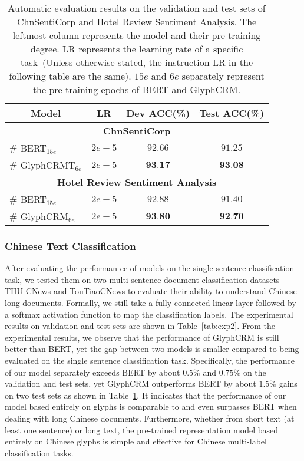 \begin{table}[t]
\renewcommand\arraystretch{1.1}
    \centering
     \caption{Automatic evaluation results on the validation and test sets of ChnSentiCorp and Hotel Review Sentiment Analysis. The leftmost column represents the model and their pre-training degree. LR represents the learning rate of a specific task~(Unless otherwise stated, the instruction LR in the following table are the same). $15e$ and $6e$ separately represent the pre-training epochs of BERT and GlyphCRM.}
    \label{tab:exp1}
    \begin{tabular}{lccc}
    \toprule[0.9pt]
    \multicolumn{1}{c}{\textbf{Model}} & \multicolumn{1}{c}{\textbf{LR}} & \multicolumn{1}{c}{\textbf{Dev ACC(\%)}} & \multicolumn{1}{c}{\textbf{Test ACC(\%)}} \\
    \midrule[0.7pt]
    \multicolumn{4}{c}{\textbf{ChnSentiCorp}}\\ \hline
    \# BERT$_{15e}$ & $2e-5$ & $92.66$ & $91.25$ \\
    \# GlyphCRMT$_{6e}$ & $2e-5$ & $\textbf{93.17}$ & $\textbf{93.08}$\\\midrule[0.7pt]
    \multicolumn{4}{c}{\textbf{Hotel Review Sentiment Analysis}}\\ \hline
    \# BERT$_{15e}$ & $2e-5$ & $92.88$ & $91.40$ \\
    \# GlyphCRM$_{6e}$ & $2e-5$ & $\textbf{93.80}$ & $\textbf{92.70}$\\
    \bottomrule[0.9pt]
    \end{tabular}
\end{table}


\subsubsection{Chinese Text Classification} After evaluating the performan-ce of models on the single sentence classification task, we tested them on two multi-sentence document classification datasets THU-CNews and TouTiaoCNews to evaluate their ability to understand Chinese long documents. Formally, we still take a fully connected linear layer followed by a softmax activation function to map the classification labels. The experimental results on validation and test sets are shown in Table~\ref{tab:exp2}. From the experimental results, we observe that the performance of GlyphCRM is still better than BERT, yet the gap between two models is smaller compared to being evaluated on the single sentence classification task. Specifically, the performance of our model separately exceeds BERT by about $0.5\%$ and $0.75\%$ on the validation and test sets, yet GlyphCRM outperforms BERT by about $1.5\%$ gains on two test sets as shown in Table~\ref{tab:exp1}. 
It indicates that the performance of our model based entirely on glyphs is comparable to and even surpasses BERT when dealing with long Chinese documents. Furthermore, whether from short text (at least one sentence) or long text, the pre-trained representation model based entirely on Chinese glyphs is simple and effective for Chinese multi-label classification tasks. 

